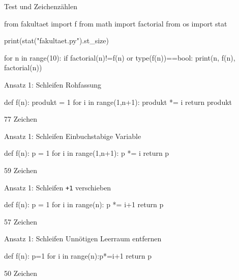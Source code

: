 \documentclass[xcolor=dvipsnames, aspectratio=43, 14pt]{beamer}
\begin{document}
\begin{frame}[fragile]{Test und Zeichenzählen}
	\begin{python3code}
	from fakultaet import f
	from math import factorial
	from os import stat
	
	print(stat("fakultaet.py").st_size)
	
	for n in range(10):
	   if factorial(n)!=f(n) or type(f(n))==bool:
	      print(n, f(n), factorial(n))
	\end{python3code}
\end{frame}

\begin{frame}[fragile]{Ansatz 1: Schleifen}
	Rohfassung
	
	\vfill
	
	\begin{python3code}
	def f(n):
	   produkt = 1
	   for i in range(1,n+1):
	      produkt *= i
	   return produkt
	\end{python3code}
	
	\vfill
	
	77 Zeichen
\end{frame}

\begin{frame}[fragile]{Ansatz 1: Schleifen}
	Einbuchstabige Variable\strut
	
	\vfill
	
	\begin{python3code}
	def f(n):
	   p = 1
	   for i in range(1,n+1):
	      p *= i
	   return p
	\end{python3code}
	
	\vfill
	
	59 Zeichen
\end{frame}

\begin{frame}[fragile]{Ansatz 1: Schleifen}
	\texttt{+1} verschieben\strut
	
	\vfill
	
	\begin{python3code}
	def f(n):
	   p = 1
	   for i in range(n):
	      p *= i+1
	   return p
	\end{python3code}
	
	\vfill
	
	57 Zeichen
\end{frame}

\begin{frame}[fragile]{Ansatz 1: Schleifen}
	Unnötigen Leerraum entfernen
	
	\vfill
	
	\begin{python3code}
	def f(n):
	   p=1
	   for i in range(n):p*=i+1
	   return p
	\end{python3code}
	
	\vfill
	
	50 Zeichen
\end{frame}
\end{document}
